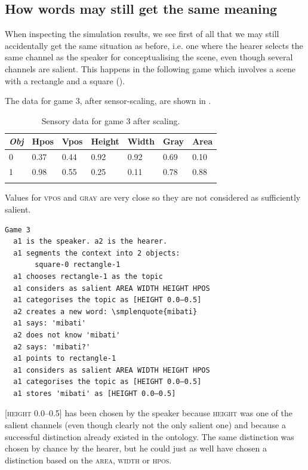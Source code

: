 \subsection{How words may still get the same meaning}

When inspecting the simulation results, we see                          
first of all that 
we may still accidentally get the same situation
as before, i.e. one where the hearer selects 
the same channel as the speaker for conceptualising 
the scene, even though several channels 
are salient. This happens in the
following game which involves a scene with a rectangle
and a square (). 

The data for game 3, after sensor-scaling,
are shown in . 


\begin{table}
\begin{center}
\begin{tabular}{ l  l  l  l  l  l  l }
\lsptoprule
{\itshape Obj} & Hpos & Vpos & Height & Width & Gray & Area \\ \midrule
0 & 0.37 & 0.44 & 0.92 & 0.92 & 0.69 & 0.10\\ 
1 & 0.98 & 0.55 & 0.25 & 0.11 & 0.78 & 0.88\\ 
\lspbottomrule
\end{tabular}
\caption{\label{tab:game3}Sensory data for game 3 after scaling.}
\end{center}
\end{table}
Values for \textsc{vpos} and \textsc{gray} are very close so they are not 
considered as sufficiently salient.
\begin{verbatim}
Game 3
  a1 is the speaker. a2 is the hearer. 
  a1 segments the context into 2 objects: 
       square-0 rectangle-1 
  a1 chooses rectangle-1 as the topic 
  a1 considers as salient AREA WIDTH HEIGHT HPOS 
  a1 categorises the topic as [HEIGHT 0.0–0.5]
  a2 creates a new word: \smplenquote{mibati}
  a1 says: 'mibati'
  a2 does not know 'mibati'
  a2 says: 'mibati?'
  a1 points to rectangle-1
  a1 considers as salient AREA WIDTH HEIGHT HPOS 
  a1 categorises the topic as [HEIGHT 0.0–0.5]
  a1 stores 'mibati' as [HEIGHT 0.0–0.5]
\end{verbatim}
{}[\textsc{height} 0.0–0.5] has been chosen by the speaker
because \textsc{height} was one of the salient channels (even 
though clearly not the only salient one) and 
because a successful distinction already existed in 
the ontology. The same 
distinction was chosen by chance by the hearer, but he 
could just as well have chosen a distinction based on 
the \textsc{area}, \textsc{width} or \textsc{hpos}. 

